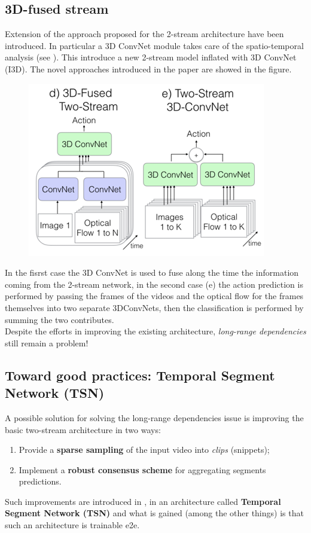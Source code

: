 \subsection{3D-fused stream}
Extension of the approach proposed for the 2-stream architecture have been introduced. In particular a 3D ConvNet module takes care of the spatio-temporal analysis (see \cite{carreira2017quo}). This introduce a new 2-stream model inflated with 3D ConvNet (I3D). The novel approaches introduced in the paper are showed in the figure.

\begin{multicols}{2}
    \begin{figure}[H]
        \centering
        \includegraphics[scale=1]{img/3dfused.png}
    \end{figure}
    In the fisrst case the 3D ConvNet is used to fuse along the time the information coming from the 2-stream network, in the second case (e) the action prediction is performed  by passing the frames of the videos and the optical flow for the frames themselves into two separate 3DConvNets, then the classification is performed by summing the two contributes.\\
    Despite the efforts in improving the existing architecture, \textit{long-range dependencies} still remain a problem!
\end{multicols}

\subsection{Toward good practices: Temporal Segment Network (TSN)}
A possible  solution for solving the long-range dependencies issue is improving the basic two-stream architecture in two ways: 
\begin{enumerate}
    \itemsep-0.3em
    \item Provide a \textbf{sparse sampling} of the input video into \textit{clips} (snippets); 
    \item Implement a \textbf{robust consensus scheme} for aggregating segments predictions.
\end{enumerate}
Such improvements are introduced in \citeauthor{wang2016temporal}, \cite{wang2016temporal} in an architecture called \textbf{Temporal Segment Network (TSN)} and what is gained (among the other things) is that such an architecture is trainable e2e.

